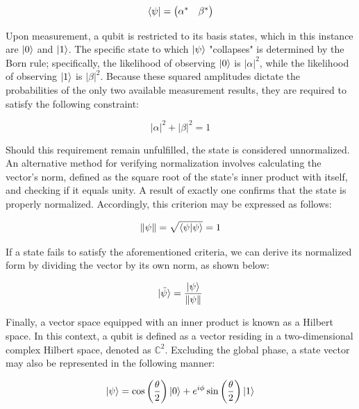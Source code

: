 \documentclass[en]{dimscthesis}
\begin{document}
\begin{equation}
	\bra{\psi} = \begin{pmatrix} \alpha^* & \beta^* \end{pmatrix}
	\label{eq:herm_conj}
\end{equation}

Upon measurement, a qubit is restricted to its basis states, which in this instance are $\ket{0}$ and $\ket{1}$. The specific state to which $\ket{\psi}$ "collapses" is determined by the Born rule; specifically, the likelihood of observing $\ket{0}$ is $\left|\alpha\right|^2$, while the likelihood of observing $\ket{1}$ is $\left|\beta\right|^2$. Because these squared amplitudes dictate the probabilities of the only two available measurement results, they are required to satisfy the following constraint:

\begin{equation}
	\left|\alpha\right|^2 + \left|\beta\right|^2 = 1
	\label{eq:prob_cond}
\end{equation}

Should this requirement remain unfulfilled, the state is considered unnormalized. An alternative method for verifying normalization involves calculating the vector's norm, defined as the square root of the state's inner product with itself, and checking if it equals unity. A result of exactly one confirms that the state is properly normalized. Accordingly, this criterion may be expressed as follows:

\begin{equation}
	\left\| \psi \right\|= \sqrt{\braket{\psi|\psi}} = 1
	\label{eq:norm_cond}
\end{equation}

If a state fails to satisfy the aforementioned criteria, we can derive its normalized form by dividing the vector by its own norm, as shown below:

\begin{equation}
	\ket{\tilde{\psi}} = \frac{\ket{\psi}}{\left\| \psi \right\|}
	\label{eq:compute_normalized}
\end{equation}

Finally, a vector space equipped with an inner product is known as a Hilbert space. In this context, a qubit is defined as a vector residing in a two-dimensional complex Hilbert space, denoted as $\mathbb{C}^2$. Excluding the global phase, a state vector may also be represented in the following manner: 

\begin{equation}
	\ket{\psi} = \cos\left(\frac{\theta}{2}\right) \ket{0} + e^{i\phi} \sin\left(\frac{\theta}{2}\right) \ket{1}
	\label{eq:trig_qubit}
\end{equation}
\end{document}
